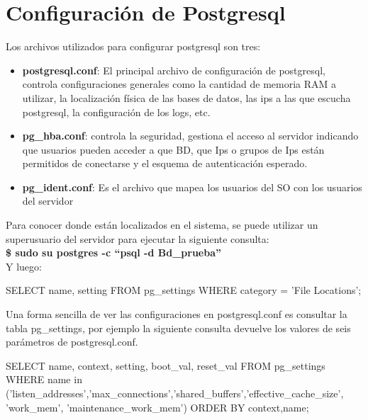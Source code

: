 \section{Configuración de Postgresql}

Los archivos utilizados para configurar postgresql son tres: \cite{Obe2012}

\begin{itemize}
\item \textbf{postgresql.conf}: El principal archivo de configuración de postgresql, controla configuraciones generales como la cantidad de memoria RAM a utilizar, la localización física de las bases de datos, las ips a las que escucha postgresql, la configuración de los logs, etc.
\item \textbf{pg\_hba.conf}: controla la seguridad, gestiona el acceso al servidor indicando que usuarios pueden acceder a que BD, que Ips o grupos de Ips están permitidos de conectarse y el esquema de autenticación esperado.
\item \textbf{pg\_ident.conf}: Es el archivo que mapea los usuarios del SO con los usuarios del servidor
\end{itemize}

Para conocer donde están localizados en el sistema, se puede utilizar un superusuario del servidor para ejecutar la siguiente consulta:\\

\textbf{\$ sudo su postgres -c ``psql -d Bd\_prueba''}\\

Y luego:\\

\begin{pyglist}
SELECT name, setting
FROM pg_settings
WHERE category = 'File Locations';
\end{pyglist}


Una forma sencilla de ver las configuraciones en postgresql.conf es consultar la tabla pg\_settings, por ejemplo la siguiente consulta devuelve los valores de seis parámetros de postgresql.conf.\\

\newpage

\begin{pyglist}
 SELECT name, context, setting, boot_val, reset_val FROM pg_settings
 WHERE name
 in ('listen_addresses','max_connections','shared_buffers','effective_cache_size',
     'work_mem', 'maintenance_work_mem')
 ORDER BY context,name;
\end{pyglist}



